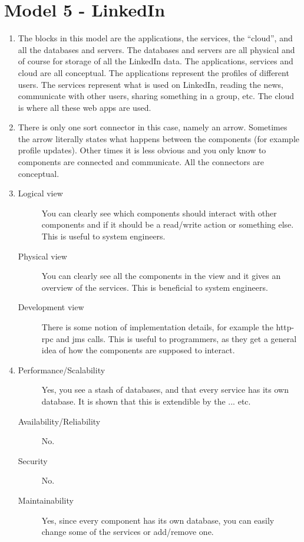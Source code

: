 \section{Model 5 - LinkedIn}
\begin{enumerate}
	\item The blocks in this model are the applications, the services, the ``cloud'', and all the databases and servers.
	The databases and servers are all physical and of course for storage of all the LinkedIn data.
	The applications, services and cloud are all conceptual. The applications represent the profiles of different users.
	The services represent what is used on LinkedIn, reading the news, communicate with other users, sharing something in a group, etc.
	The cloud is where all these web apps are used.
	
	\item There is only one sort connector in this case, namely an arrow.
	Sometimes the arrow literally states what happens between the components (for example profile updates).
	Other times it is less obvious and you only know to components are connected and communicate.
	All the connectors are conceptual.
	
	\item 
    \begin{description}
        \item[Logical view] You can clearly see which components should interact with other components and if it should be a read/write action or something else. 
        This is useful to system engineers.
        \item[Physical view] You can clearly see all the components in the view and it gives an overview of the services.
        This is beneficial to system engineers.
        \item[Development view] There is some notion of implementation details, for example the http-rpc and jms calls.
        This is useful to programmers, as they get a general idea of how the components are supposed to interact.
    \end{description}
	
	\item
	\begin{description}
		\item[Performance/Scalability] Yes, you see a stash of databases, and that every service has its own database.
		It is shown that this is extendible by the ... etc.
		\item[Availability/Reliability] No.
		\item[Security] No.
		\item[Maintainability] Yes, since every component has its own database, you can easily change some of the services or add/remove one.
	\end{description}
	

\end{enumerate}
